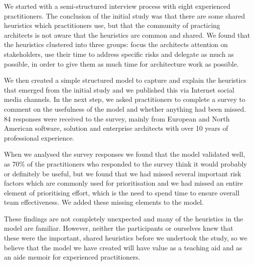 We started with a semi-structured interview process with eight experienced practitioners.  The conclusion of the initial study was that there are some shared heuristics which practitioners use, but that the community of practicing architects is not aware that the heuristics are common and shared.  We found that the heuristics clustered into three groups: focus the architects attention on stakeholders, use their time to address specific risks and delegate as much as possible, in order to give them as much time for architecture work as possible.

We then created a simple structured model to capture and explain the heuristics that emerged from the initial study and we published this via Internet social media channels.  In the next step, we asked practitioners to complete a survey to comment on the usefulness of the model and whether anything had been missed.  84 responses were received to the survey, mainly from European and North American software, solution and enterprise architects with over 10 years of professional experience.

When we analysed the survey responses we found that the model validated well, as 70\% of the practitioners who responded to the survey think it would probably or definitely be useful, but we found that we had missed several important risk factors which are commonly used for prioritisation and we had missed an entire element of prioritising effort, which is the need to spend time to ensure overall team effectiveness.  We added these missing elements to the model.

These findings are not completely unexpected and many of the heuristics in the model are familiar.  However, neither the participants or ourselves knew that these were the important, shared heuristics before we undertook the study, so we believe that the model we have created will have value as a teaching aid and as an aide memoir for experienced practitioners.  


